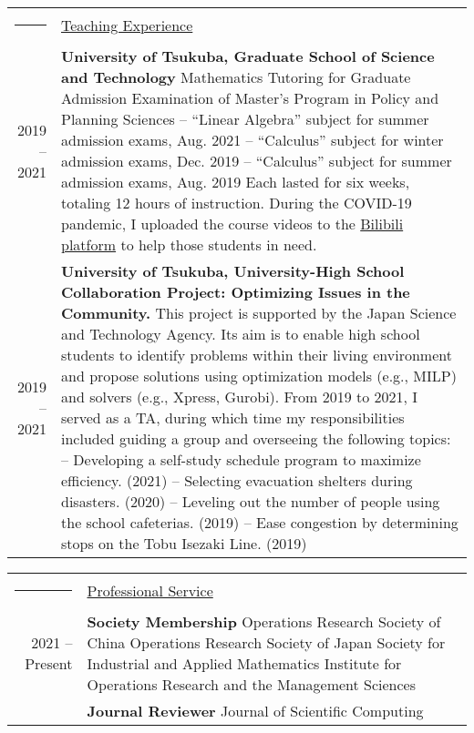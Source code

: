 \documentclass[a4paper,10pt]{article}
\newcommand{\headingfont}{\LARGE \MakeUppercase }
\newenvironment{SectionTable}[1]{
	\renewcommand*{\arraystretch}{1.0}
	\setlength{\tabcolsep}{10pt}
	\begin{longtable}{Rp{5.2in}} 
		\rule{2.3cm}{4pt} 
		& \underline{#1} \\ %
	}
	{
	\end{longtable}\vspace{-.3cm}
}
\begin{document}
\begin{SectionTable}{\headingfont Teaching Experience}
	2019 -- 2021 &
	\textbf{University of Tsukuba, Graduate School of Science and Technology} \newline
	Mathematics Tutoring for Graduate Admission Examination of Master's Program in Policy and Planning Sciences \newline
	-- ``Linear Algebra'' subject for summer admission exams, Aug. 2021  \newline
	-- ``Calculus'' subject for winter admission exams, Dec. 2019 \newline
	-- ``Calculus'' subject for summer admission exams, Aug. 2019 \newline
	Each lasted for six weeks, totaling 12 hours of instruction. During the COVID-19 pandemic, I uploaded the course videos to the \href{https://space.bilibili.com/16115578}{Bilibili platform} to help those students in need. \\
	 
	 2019 -- 2021 &
	 \textbf{University of Tsukuba, University-High School Collaboration Project: Optimizing Issues in the Community.} \newline	
	This project is supported by the Japan Science and Technology Agency. Its aim is to enable high school students to identify problems within their living environment and propose solutions using optimization models (e.g., MILP) and solvers (e.g., Xpress, Gurobi). \newline	
	From 2019 to 2021, I served as a TA, during which time my responsibilities included guiding a group and overseeing the following topics: \newline
	--  {Developing a self-study schedule program to maximize efficiency}. (2021) \newline
	--  {Selecting evacuation shelters during disasters}. (2020) \newline 
	--  {Leveling out the number of people using the school cafeterias}. (2019) \newline
	--  {Ease congestion by determining stops on the Tobu Isezaki Line}. (2019) 
\end{SectionTable}

\begin{SectionTable}{\headingfont Professional Service}
	2021 -- Present & 
	\textbf{Society Membership} \newline
	Operations Research Society of China \newline
	Operations Research Society of Japan \newline
	Society for Industrial and Applied Mathematics \newline
	Institute for Operations Research and the Management Sciences \\
	
	& \textbf{Journal Reviewer} \newline
	Journal of Scientific Computing
\end{SectionTable}
\end{document}
